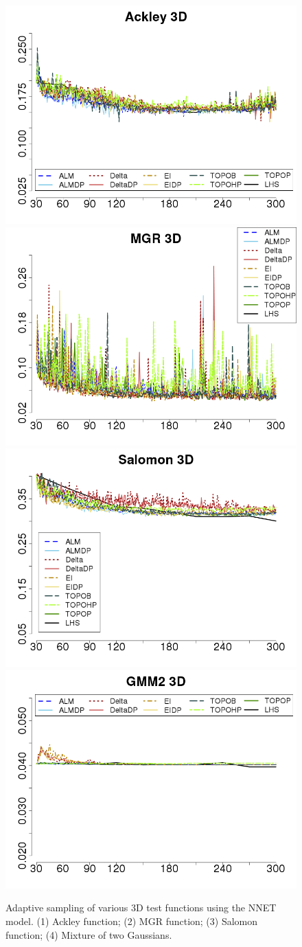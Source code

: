 \begin{figure}[htbp]
\begin{center}
\includegraphics[width=0.48\linewidth]{figs/chap5/nnet_Ackley_td=30}\label{fig:ackley3D_nnet}
\includegraphics[width=0.48\linewidth]{figs/chap5/nnet_MGR_td=30}\label{fig:mgr3D_nnet}
\includegraphics[width=0.48\linewidth]{figs/chap5/nnet_Salomon_td=30}\label{fig:salomon3D_nnet}
\includegraphics[width=0.48\linewidth]{figs/chap5/nnet_GMM2_3D_td=30}\label{fig:gmm23D_nnet}
\caption{Adaptive sampling of various 3D test functions using the
  NNET model. (1) Ackley function; (2) MGR function; (3) Salomon function; (4) Mixture of two Gaussians.}
  \label{fig:nnet_3D}
\end{center}
\end{figure}

